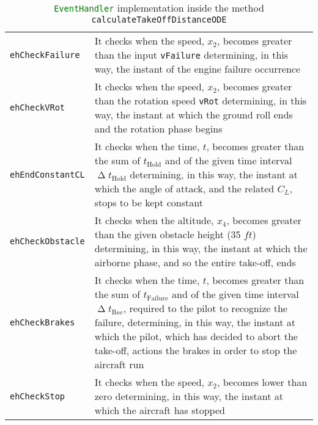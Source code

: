 \begin{table}[!b]
\begin{tabular}{p{0.17\linewidth}p{0.83\linewidth}}
\toprule
\lstinline[language=Java]!ehCheckFailure! & It checks when the speed, $x_2$, becomes greater than the input \lstinline[language=Java]!vFailure! determining, in this way, the instant of the engine failure occurrence \\ [0.2cm]
\lstinline[language=Java]!ehCheckVRot! & It checks when the speed, $x_2$, becomes greater than the rotation speed \lstinline[language=Java]!vRot! determining, in this way, the instant at which the ground roll ends and the rotation phase begins \\  [0.2cm]
\lstinline[language=Java]!ehEndConstantCL! & It checks when the time, $t$, becomes greater than the sum of  $t_{\text{Hold}}$ and of the given time interval $\upDelta t_{\text{Hold}}$ determining, in this way, the instant at which the angle of attack, and the related $C_L$, stops to be kept constant \\  [0.2cm]
\lstinline[language=Java]!ehCheckObstacle! & It checks when the altitude, $x_4$, becomes greater than the given obstacle height (35 $\si{ft}$) determining, in this way, the instant at which the airborne phase, and so the entire take-off, ends \\  [0.2cm]
\lstinline[language=Java]!ehCheckBrakes! & It checks when the time, $t$, becomes greater than the sum of  $t_{\text{Failure}}$ and of the given time interval $\upDelta t_{\text{Rec}}$, required to the pilot to recognize the failure, determining, in this way, the instant at which the pilot, which has decided to abort the take-off, actions the brakes in order to stop the aircraft run\\  [0.2cm]
\lstinline[language=Java]!ehCheckStop! &  It checks when the speed, $x_2$, becomes lower than zero determining, in this way, the instant at which the aircraft has stopped \\ 
\bottomrule
\end{tabular}
\caption{\lstinline[language=Java]!EventHandler! implementation inside the method \lstinline[language=Java]!calculateTakeOffDistanceODE!}
\label{table:EventHandler}
\end{table}

